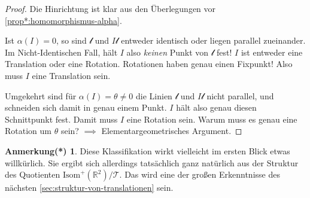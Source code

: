 \documentclass[a4paper, ngerman]{article}
\newcounter{chapter}
\numberwithin{equation}{chapter}
\theoremstyle{plain}
\theoremstyle{definition}
\newtheorem{annotationstrd}{Anmerkung(*)}[chapter]
\newcommand{\anm}[1]{{\color{red} #1}}
\begin{document}
\begin{proof}
    Die Hinrichtung ist klar aus den Überlegungen vor \cref{prop*:homomorphismus-alpha}. 

    Ist \(\alpha(I)=0\), so sind \(\mathscr l\) und \(I\mathscr l\) entweder identisch oder liegen parallel zueinander. Im Nicht-Identischen Fall, hält \(I\) also \textit{keinen} Punkt von \(\mathscr l\) fest! \(I\) ist entweder eine Translation oder eine Rotation. Rotationen haben genau einen Fixpunkt! Also muss \(I\) eine Translation sein. 

    Umgekehrt sind für \(\alpha(I)=\theta\neq0\) die Linien \(\mathscr l\) und \(I\mathscr l\) nicht parallel, und schneiden sich damit in genau einem Punkt. \(I\) hält also genau diesen Schnittpunkt fest. Damit muss \(I\) eine Rotation sein. Warum muss es genau eine Rotation um \(\theta\) sein? \(\implies\) Elementargeometrisches Argument. 
\end{proof}

\begin{annotationstrd}
    Diese Klassifikation wirkt vielleicht im ersten Blick etwas will\-kür\-lich. Sie ergibt sich allerdings tatsächlich ganz natürlich aus der Struktur des Quotienten \(\mathrm{Isom}^+(\mathbb R^2) /\mathcal T\). Das wird eine der großen Erkenntnisse des nächsten \cref{sec:struktur-von-translationen} sein. 
\end{annotationstrd}




\end{document}
